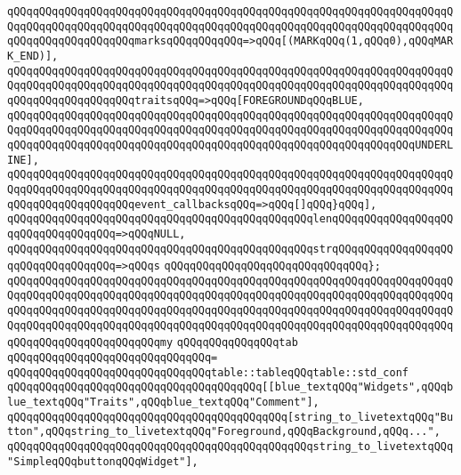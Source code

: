 \verb|qQQqqQQqqQQqqQQqqQQqqQQqqQQqqQQqqQQqqQQqqQQqqQQqqQQqqQQqqQQqqQQqqQQqqQQqqQQqqQQqqQQqqQQqqQQqqQQqqQQqqQQqqQQqqQQqqQQqqQQqqQQqqQQqqQQqqQQqqQQqqQQqqQQqqQQqqQQqqQQqmarksqQQqqQQqqQQq=>qQQq[(MARKqQQq(1,qQQq0),qQQqMARK_END)],|\newline
\verb|qQQqqQQqqQQqqQQqqQQqqQQqqQQqqQQqqQQqqQQqqQQqqQQqqQQqqQQqqQQqqQQqqQQqqQQqqQQqqQQqqQQqqQQqqQQqqQQqqQQqqQQqqQQqqQQqqQQqqQQqqQQqqQQqqQQqqQQqqQQqqQQqqQQqqQQqqQQqqQQqtraitsqQQq=>qQQq[FOREGROUNDqQQqBLUE,|\newline
\verb|qQQqqQQqqQQqqQQqqQQqqQQqqQQqqQQqqQQqqQQqqQQqqQQqqQQqqQQqqQQqqQQqqQQqqQQqqQQqqQQqqQQqqQQqqQQqqQQqqQQqqQQqqQQqqQQqqQQqqQQqqQQqqQQqqQQqqQQqqQQqqQQqqQQqqQQqqQQqqQQqqQQqqQQqqQQqqQQqqQQqqQQqqQQqqQQqqQQqqQQqqQQqUNDERLINE],|\newline
\verb|qQQqqQQqqQQqqQQqqQQqqQQqqQQqqQQqqQQqqQQqqQQqqQQqqQQqqQQqqQQqqQQqqQQqqQQqqQQqqQQqqQQqqQQqqQQqqQQqqQQqqQQqqQQqqQQqqQQqqQQqqQQqqQQqqQQqqQQqqQQqqQQqqQQqqQQqqQQqqQQqevent_callbacksqQQq=>qQQq[]qQQq}qQQq],|\newline
\verb|qQQqqQQqqQQqqQQqqQQqqQQqqQQqqQQqqQQqqQQqqQQqqQQqlenqQQqqQQqqQQqqQQqqQQqqQQqqQQqqQQqqQQq=>qQQqNULL,|\newline
\verb|qQQqqQQqqQQqqQQqqQQqqQQqqQQqqQQqqQQqqQQqqQQqqQQqstrqQQqqQQqqQQqqQQqqQQqqQQqqQQqqQQqqQQq=>qQQqs|\newline
\verb|qQQqqQQqqQQqqQQqqQQqqQQqqQQqqQQq};|\newline
\verb|qQQqqQQqqQQqqQQqqQQqqQQqqQQqqQQqqQQqqQQqqQQqqQQqqQQqqQQqqQQqqQQqqQQqqQQqqQQqqQQqqQQqqQQqqQQqqQQqqQQqqQQqqQQqqQQqqQQqqQQqqQQqqQQqqQQqqQQqqQQqqQQqqQQqqQQqqQQqqQQqqQQqqQQqqQQqqQQqqQQqqQQqqQQqqQQqqQQqqQQqqQQqqQQqqQQqqQQqqQQqqQQqqQQqqQQqqQQqqQQqqQQqqQQqqQQqqQQqqQQqqQQqqQQqqQQqqQQqqQQqqQQqqQQqqQQqqQQqqQQqqQQqmy|\newline
\verb|qQQqqQQqqQQqqQQqtab|\newline
\verb|qQQqqQQqqQQqqQQqqQQqqQQqqQQqqQQq=|\newline
\verb|qQQqqQQqqQQqqQQqqQQqqQQqqQQqqQQqtable::tableqQQqtable::std_conf|\newline
\verb|qQQqqQQqqQQqqQQqqQQqqQQqqQQqqQQqqQQqqQQq[[blue_textqQQq"Widgets",qQQqblue_textqQQq"Traits",qQQqblue_textqQQq"Comment"],|\newline
\verb|qQQqqQQqqQQqqQQqqQQqqQQqqQQqqQQqqQQqqQQqqQQq[string_to_livetextqQQq"Button",qQQqstring_to_livetextqQQq"Foreground,qQQqBackground,qQQq...",|\newline
\verb|qQQqqQQqqQQqqQQqqQQqqQQqqQQqqQQqqQQqqQQqqQQqqQQqstring_to_livetextqQQq"SimpleqQQqbuttonqQQqWidget"],|\newline
